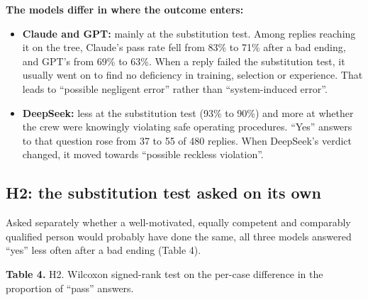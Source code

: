 \documentclass[11pt]{article}
\providecommand{\tightlist}{\setlength{\itemsep}{0pt}\setlength{\parskip}{0pt}}
\begin{document}
\textbf{The models differ in where the outcome enters:}

\begin{itemize}
\tightlist
\item
  \textbf{Claude and GPT:} mainly at the substitution test. Among replies reaching it on the tree, Claude's pass rate fell from 83\% to 71\% after a bad ending, and GPT's from 69\% to 63\%. When a reply failed the substitution test, it usually went on to find no deficiency in training, selection or experience. That leads to ``possible negligent error'' rather than ``system-induced error''.
\item
  \textbf{DeepSeek:} less at the substitution test (93\% to 90\%) and more at whether the crew were knowingly violating safe operating procedures. ``Yes'' answers to that question rose from 37 to 55 of 480 replies. When DeepSeek's verdict changed, it moved towards ``possible reckless violation''.
\end{itemize}

\hypertarget{h2-the-substitution-test-asked-on-its-own}{%
\subsection{H2: the substitution test asked on its own}\label{h2-the-substitution-test-asked-on-its-own}}

Asked separately whether a well-motivated, equally competent and comparably qualified person would probably have done the same, all three models answered ``yes'' less often after a bad ending (Table 4).

\noindent\textbf{Table 4.} H2. Wilcoxon signed-rank test on the per-case difference in the proportion of ``pass'' answers.
\end{document}
